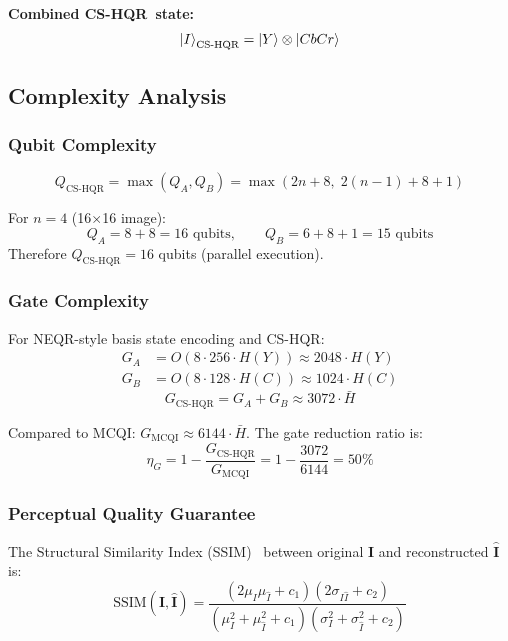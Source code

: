 \documentclass{ipol}
\newcommand{\cshqr}{\textsc{CS-HQR}}
\newcommand{\mcqi}{\textsc{MCQI}}
\begin{document}
\textbf{Combined \cshqr\ state:}
\begin{equation}
\ket{I}_{\text{CS-HQR}} = \ket{Y} \otimes \ket{CbCr}
\label{eq:cshqr_combined}
\end{equation}

\FloatBarrier
\subsection{Complexity Analysis}

\FloatBarrier
\subsubsection{Qubit Complexity}

$$Q_{\text{CS-HQR}} = \max(Q_A, Q_B) = \max(2n + 8, \; 2(n-1) + 8 + 1)$$

For $n = 4$ (16$\times$16 image):
$$Q_A = 8 + 8 = 16 \text{ qubits}, \qquad Q_B = 6 + 8 + 1 = 15 \text{ qubits}$$
Therefore $Q_{\text{CS-HQR}} = 16$ qubits (parallel execution).

\FloatBarrier
\subsubsection{Gate Complexity}

For NEQR-style basis state encoding and \cshqr:
\begin{align}
G_A &= O(8 \cdot 256 \cdot H(Y)) \approx 2048 \cdot H(Y) \\
G_B &= O(8 \cdot 128 \cdot H(C)) \approx 1024 \cdot H(C)
\end{align}
\begin{equation}
G_{\text{CS-HQR}} = G_A + G_B \approx 3072 \cdot \bar{H}
\label{eq:cshqr_gates}
\end{equation}

Compared to \mcqi: $G_{\text{MCQI}} \approx 6144 \cdot \bar{H}$.
The gate reduction ratio is:
\begin{equation}
\eta_G = 1 - \frac{G_{\text{CS-HQR}}}{G_{\text{MCQI}}} =
  1 - \frac{3072}{6144} = 50\%
\label{eq:gate_reduction}
\end{equation}

\FloatBarrier
\subsubsection{Perceptual Quality Guarantee}

The Structural Similarity Index (SSIM)~\cite{ref7} between original
$\mathbf{I}$ and reconstructed $\hat{\mathbf{I}}$ is:
\begin{equation}
\text{SSIM}(\mathbf{I}, \hat{\mathbf{I}}) =
  \frac{(2\mu_I\mu_{\hat{I}} + c_1)(2\sigma_{I\hat{I}} + c_2)}
       {(\mu_I^2 + \mu_{\hat{I}}^2 + c_1)(\sigma_I^2 + \sigma_{\hat{I}}^2 + c_2)}
\label{eq:ssim}
\end{equation}
\end{document}
